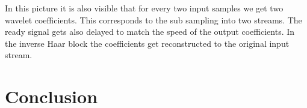 \begin{refsection}

In this picture it is also visible that for every two input samples we get two wavelet coefficients. This corresponds to the sub sampling into two streams. The ready signal gets also delayed to match the speed of the output coefficients. In the inverse Haar block the coefficients get reconstructed to the original input stream.







\section{Conclusion}

\printbibliography[heading=subbibliography]
\end{refsection}
